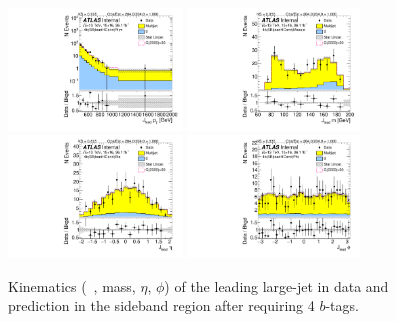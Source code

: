 \begin{figure}[htb!]
\begin{center}
\includegraphics[width=0.41\textwidth,angle=-90]{figures/boosted/Sideband/b77_FourTag_Sideband_leadHCand_Pt_m_1.pdf}
\includegraphics[width=0.41\textwidth,angle=-90]{figures/boosted/Sideband/b77_FourTag_Sideband_leadHCand_Mass_s.pdf}\\
\includegraphics[width=0.41\textwidth,angle=-90]{figures/boosted/Sideband/b77_FourTag_Sideband_leadHCand_Eta.pdf}
\includegraphics[width=0.41\textwidth,angle=-90]{figures/boosted/Sideband/b77_FourTag_Sideband_leadHCand_Phi.pdf}
  \caption{Kinematics (\pt~, mass, $\eta$, $\phi$) of the leading large-\R jet in data and prediction in the sideband region after requiring 4 $b$-tags.}
  \label{fig:boosted-4b-sideband-ak10-lead}
\end{center}
\end{figure}

